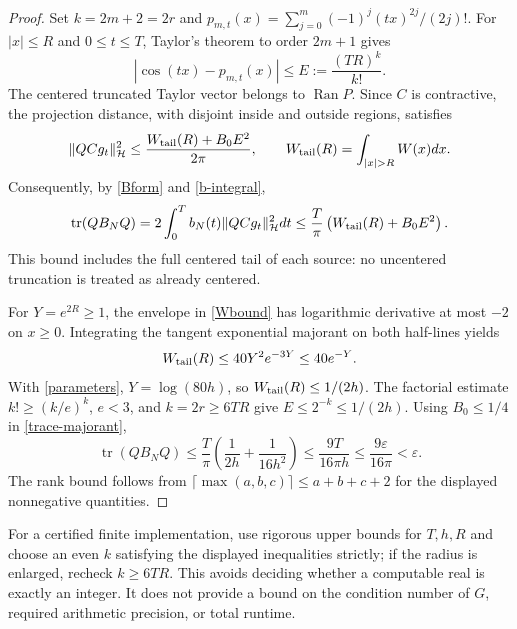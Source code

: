 \documentclass[11pt]{article}
\begin{document}
\begin{proof}
Set $k=2m+2=2r$ and $p_{m,t}(x)=\sum_{j=0}^m(-1)^j(tx)^{2j}/(2j)!$. For $|x|\le R$ and $0\le t\le T$, Taylor's theorem to order $2m+1$ gives
\[|\cos(tx)-p_{m,t}(x)|\le E:=\frac{(TR)^k}{k!}.
\]
The centered truncated Taylor vector belongs to $\operatorname{Ran}P$. Since $C$ is contractive, the projection distance, with disjoint inside and outside regions, satisfies
\begin{equation}\label{distance}
 \norm{QCg_t}_{\Hh}^2\le\frac{W_{\rm tail}(R)+B_0E^2}{2\pi},\qquad W_{\rm tail}(R)=\int_{|x|>R}W(x)dx.
\end{equation}
Consequently, by \eqref{Bform} and \eqref{b-integral},
\begin{equation}\label{trace-majorant}
 \operatorname{tr}(QB_NQ)=2\int_0^T b_N(t)\lVert QCg_t\rVert_{\mathcal H}^2dt
 \le\frac{T}{\pi}\left(W_{\rm tail}(R)+B_0E^2\right).
\end{equation}
This bound includes the full centered tail of each source: no uncentered truncation is treated as already centered.

For $Y=e^{2R}\ge1$, the envelope in \eqref{Wbound} has logarithmic derivative at most $-2$ on $x\ge0$. Integrating the tangent exponential majorant on both half-lines yields
\begin{equation}\label{Wtail}
 W_{\rm tail}(R)\le40Y^2e^{-3Y}\le40e^{-Y}.
\end{equation}
With \eqref{parameters}, $Y=\log(80h)$, so $W_{\rm tail}(R)\le1/(2h)$. The factorial estimate $k!\ge(k/e)^k$, $e<3$, and $k=2r\ge6TR$ give $E\le2^{-k}\le1/(2h)$. Using $B_0\le1/4$ in \eqref{trace-majorant},
\[\operatorname{tr}(QB_NQ)\le\frac{T}{\pi}\left(\frac1{2h}+\frac1{16h^2}\right)
 \le\frac{9T}{16\pi h}\le\frac{9\varepsilon}{16\pi}<\varepsilon.
\]
The rank bound follows from $\lceil\max(a,b,c)\rceil\le a+b+c+2$ for the displayed nonnegative quantities.
\end{proof}
For a certified finite implementation, use rigorous upper bounds for $T,h,R$ and choose an even $k$ satisfying the displayed inequalities strictly; if the radius is enlarged, recheck $k\ge6TR$. This avoids deciding whether a computable real is exactly an integer. It does not provide a bound on the condition number of $G$, required arithmetic precision, or total runtime.
\end{document}
